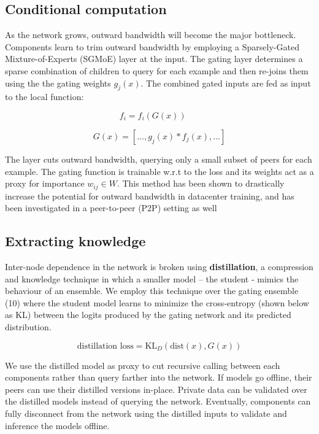\documentclass{article}
\begin{document}
\subsection{Conditional computation}

As the network grows, outward bandwidth will become the major bottleneck. Components learn to trim outward bandwidth by employing a Sparsely-Gated Mixture-of-Experts (SGMoE) \cite{shazeer2017outrageously} layer at the input. The gating layer determines a sparse combination of children to query for each example and then re-joins them using the the gating weights $g_j(x)$. The combined gated inputs are fed as input to the local function: 

\begin{equation}
f_i = f_i(G(x)) \ \ \ \  \textrm{ }
\end{equation}

\begin{equation}
G(x) = [ ..., g_j(x) * f_j(x), ...]
\end{equation}


The layer cuts outward bandwidth, querying only a small subset of peers for each example. The gating function is trainable w.r.t to the loss and its weights act as a proxy for importance $w_{ij} \in W$. This method has been shown to drastically increase the potential for outward bandwidth in datacenter training,\cite{shazeer2017outrageously} and has been investigated in a peer-to-peer (P2P) setting as well \cite{Riabinin2020learningathome}


\subsection{Extracting knowledge}

Inter-node dependence in the network is broken using \textbf{distillation}\cite{hinton2015distilling}, a compression and knowledge technique in which a smaller model -- the student - mimics the behaviour of an ensemble. We employ this technique over the gating ensemble (10) where the student model learns to minimize the cross-entropy (shown below as KL) between the logits produced by the gating network and its predicted distribution. \cite{Sanh2019DistilBERT}
\smallskip

\begin{equation}
\textrm{distillation loss} = \text{KL}_D(\text{dist}(x), G(x)) 
\end{equation}

We use the distilled model as proxy to cut recursive calling between each components rather than query farther into the network. If models go offline, their peers can use their distilled versions in-place. Private data can be validated over the distilled models instead of querying the network. Eventually, components can fully disconnect from the network using the distilled inputs to validate and inference the models offline.
\smallskip
\end{document}
